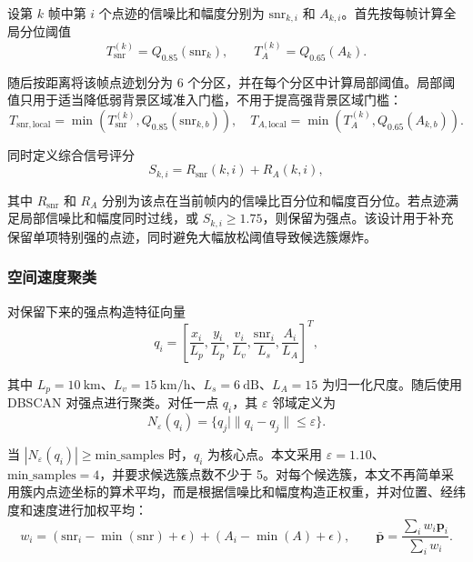 \documentclass[UTF8,a4paper,12pt]{ctexart}
\numberwithin{figure}{section}
\numberwithin{table}{section}
\begin{document}
设第 \(k\) 帧中第 \(i\) 个点迹的信噪比和幅度分别为 \(\mathrm{snr}_{k,i}\) 和 \(A_{k,i}\)。首先按每帧计算全局分位阈值
\begin{equation}
  T_{\mathrm{snr}}^{(k)}=Q_{0.85}\left(\mathrm{snr}_{k}\right),
  \qquad
  T_{A}^{(k)}=Q_{0.65}\left(A_k\right).
  \label{eq:global_threshold}
\end{equation}

随后按距离将该帧点迹划分为 6 个分区，并在每个分区中计算局部阈值。局部阈值只用于适当降低弱背景区域准入门槛，不用于提高强背景区域门槛：
\begin{equation}
  T_{\mathrm{snr,local}}=\min\left(T_{\mathrm{snr}}^{(k)}, Q_{0.85}(\mathrm{snr}_{k,b})\right),
  \quad
  T_{A,\mathrm{local}}=\min\left(T_A^{(k)}, Q_{0.65}(A_{k,b})\right).
  \label{eq:local_threshold}
\end{equation}

同时定义综合信号评分
\begin{equation}
  S_{k,i}=R_{\mathrm{snr}}(k,i)+R_A(k,i),
  \label{eq:signal_score}
\end{equation}

其中 \(R_{\mathrm{snr}}\) 和 \(R_A\) 分别为该点在当前帧内的信噪比百分位和幅度百分位。若点迹满足局部信噪比和幅度同时过线，或 \(S_{k,i}\ge 1.75\)，则保留为强点。该设计用于补充保留单项特别强的点迹，同时避免大幅放松阈值导致候选簇爆炸。

\subsubsection{空间速度聚类}

对保留下来的强点构造特征向量
\begin{equation}
  q_i=\left[
  \frac{x_i}{L_p},
  \frac{y_i}{L_p},
  \frac{v_i}{L_v},
  \frac{\mathrm{snr}_i}{L_s},
  \frac{A_i}{L_A}
  \right]^T,
  \label{eq:feature}
\end{equation}

其中 \(L_p=10\ \mathrm{km}\)、\(L_v=15\ \mathrm{km/h}\)、\(L_s=6\ \mathrm{dB}\)、\(L_A=15\) 为归一化尺度。随后使用 DBSCAN 对强点进行聚类。对任一点 \(q_i\)，其 \(\varepsilon\) 邻域定义为
\begin{equation}
  N_{\varepsilon}(q_i)=\{q_j\mid \|q_i-q_j\|\le \varepsilon\}.
  \label{eq:dbscan}
\end{equation}

当 \(|N_{\varepsilon}(q_i)|\ge \mathrm{min\_samples}\) 时，\(q_i\) 为核心点。本文采用 \(\varepsilon=1.10\)、\(\mathrm{min\_samples}=4\)，并要求候选簇点数不少于 5。对每个候选簇，本文不再简单采用簇内点迹坐标的算术平均，而是根据信噪比和幅度构造正权重，并对位置、经纬度和速度进行加权平均：
\begin{equation}
  w_i =
  \left(\mathrm{snr}_i-\min(\mathrm{snr})+\epsilon\right)
  +
  \left(A_i-\min(A)+\epsilon\right),
  \qquad
  \bar{\mathbf{p}}=\frac{\sum_i w_i\mathbf{p}_i}{\sum_i w_i}.
  \label{eq:weighted_center}
\end{equation}
\end{document}
